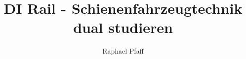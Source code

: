 \documentclass[slidestop,compress,mathserif, aspectratio = 169]{beamer}
\begin{document}
\newcommand{\source}[1]{\rotatebox{90}{\tiny \color{gray} #1}}

\newcommand{\done}{${\color{teal}\checkmark}$}

\title{DI Rail - Schienenfahrzeugtechnik dual studieren}
\author{Raphael Pfaff}



{
\frame{\titlepage}}

%
%
\end{document}

